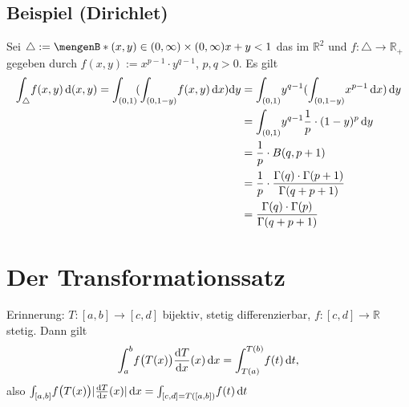 \subsection{Beispiel (Dirichlet)} %
\label{sub:713}
Sei $\triangle := \set[(x,y) \in (0,\infty) \times (0,\infty)]{x+y<1} $ das  im $\mathds{R}^2$ und $f : \triangle \to \mathds{R}_+$ gegeben durch
$f(x,y) := x^{p-1} \cdot y^{q-1}$, $p,q >0$. Es gilt
\begin{align*}
	\int_{\triangle}\! f(x,y)  \, \mathrm{d}(x,y) =  \int_{(0,1)}\! (\int_{(0,1-y)}\! f(x,y)  \, \mathrm{d}x )   \mathrm{d}y 
	&= \int_{(0,1)}\! y^{q-1} (\int_{(0,1-y)}\! x^{p-1}  \, \mathrm{d}x )  \, \mathrm{d}y \\ 
	&= \int_{(0,1)}\! y^{q-1} \frac{1}{p} \cdot (1-y)^p  \, \mathrm{d}y \\
	&= \frac{1}{p} \cdot B(q,p+1) \\
	&= \frac{1}{p} \cdot \frac{\Gamma(q) \cdot \Gamma(p+1)}{\Gamma(q+p+1)} \\
	&= \frac{\Gamma(q) \cdot \Gamma(p)}{\Gamma(q+p+1)}  
\end{align*}
\newpage

\section{Der Transformationssatz} %
\label{sec:8}
Erinnerung: $T : [a,b] \to [c,d]$ bijektiv, stetig differenzierbar, $f : [c,d] \to \mathds{R}$ stetig. Dann gilt 
\[
	\int_{a} ^{b} \! f\big(T(x)\big) \frac{\mathrm{d} T}{\mathrm{d} x} (x) \, \mathrm{d}x  = \int_{T(a)} ^{T(b)} \! f(t)  \, \mathrm{d}t,
\]
also $\int_{[a,b]}\! f\big( T(x)\big) \lvert \frac{\mathrm{d} T}{\mathrm{d} x} (x)\rvert  \, \mathrm{d}x = \int_{[c,d] = T([a,b])}\! f(t)  \, \mathrm{d}t$

